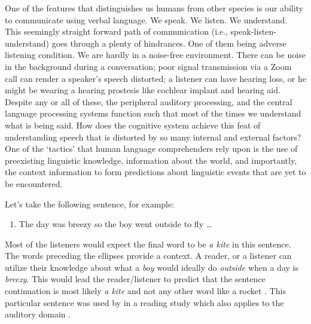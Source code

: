 \documentclass[a4paper, nobind]{templates/ociamthesis}
\providecommand{\tightlist}{%
  \setlength{\itemsep}{0pt}\setlength{\parskip}{0pt}}
\begin{document}
One of the features that distinguishes us humans from other species is our ability to communicate using verbal language.
We speak. We listen. We understand.
This seemingly straight forward path of communication (i.e., speak-listen-understand) goes through a plenty of hindrances.
One of them being adverse listening condition.
We are hardly in a noise-free environment.
There can be noise in the background during a conversation;
poor signal transmission via a Zoom call can render a speaker's speech distorted;
a listener can have hearing loss, or he might be wearing a hearing prostesis like cochlear implant and hearing aid.
Despite any or all of these, the peripheral auditory processing, and the central language processing systems function such that most of the times we understand what is being said.
How does the cognitive system achieve this feat of understanding speech that is distorted by so many internal and external factors?
One of the `tactics' that human language comprehenders rely upon is the use of preexisting linguistic knowledge, information about the world, and importantly, the context information to form predictions about linguistic events that are yet to be encountered.

Let's take the following sentence, for example:

\begin{enumerate}
\def\labelenumi{(\arabic{enumi})}
\tightlist
\item
  The day was breezy so the boy went outside to fly \ldots{}
\end{enumerate}

Most of the listeners would expect the final word to be \emph{a kite} in this sentence.
The words preceding the ellipses provide a context.
A reader, or a listener can utilize their knowledge about what a \emph{boy} would ideally do \emph{outside} when a day is \emph{breezy}.
This would lead the reader/listener to predict that the sentence continuation is most likely \emph{a kite} and not any other word like a rocket \autocites{Delong2005}[cf.][]{Nieuwland2020a}.
This particular sentence was used by \textcite{Delong2005} in a reading study which also applies to the auditory domain \autocite{Altmann2007}.
\end{document}
